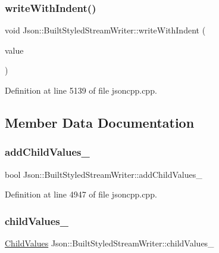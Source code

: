 \subsubsection{\texorpdfstring{write\+With\+Indent()}{writeWithIndent()}}
{\footnotesize\ttfamily void Json\+::\+Built\+Styled\+Stream\+Writer\+::write\+With\+Indent (\begin{DoxyParamCaption}\item[{\hyperlink{config_8h_a1e723f95759de062585bc4a8fd3fa4be}{J\+S\+O\+N\+C\+P\+P\+\_\+\+S\+T\+R\+I\+NG} const \&}]{value }\end{DoxyParamCaption})\hspace{0.3cm}{\ttfamily [private]}}



Definition at line 5139 of file jsoncpp.\+cpp.



\subsection{Member Data Documentation}
\hypertarget{struct_json_1_1_built_styled_stream_writer_abed9cc31da503b48798e7cea68c42e16}{}\label{struct_json_1_1_built_styled_stream_writer_abed9cc31da503b48798e7cea68c42e16} 
\subsubsection{\texorpdfstring{add\+Child\+Values\+\_\+}{addChildValues\_}}
{\footnotesize\ttfamily bool Json\+::\+Built\+Styled\+Stream\+Writer\+::add\+Child\+Values\+\_\+\hspace{0.3cm}{\ttfamily [private]}}



Definition at line 4947 of file jsoncpp.\+cpp.

\hypertarget{struct_json_1_1_built_styled_stream_writer_a47d562d7874c5b1e68995bd62f575792}{}\label{struct_json_1_1_built_styled_stream_writer_a47d562d7874c5b1e68995bd62f575792} 
\subsubsection{\texorpdfstring{child\+Values\+\_\+}{childValues\_}}
{\footnotesize\ttfamily \hyperlink{struct_json_1_1_built_styled_stream_writer_a63196b38400e5ce452f65ce856d47b6f}{Child\+Values} Json\+::\+Built\+Styled\+Stream\+Writer\+::child\+Values\+\_\+\hspace{0.3cm}{\ttfamily [private]}}



